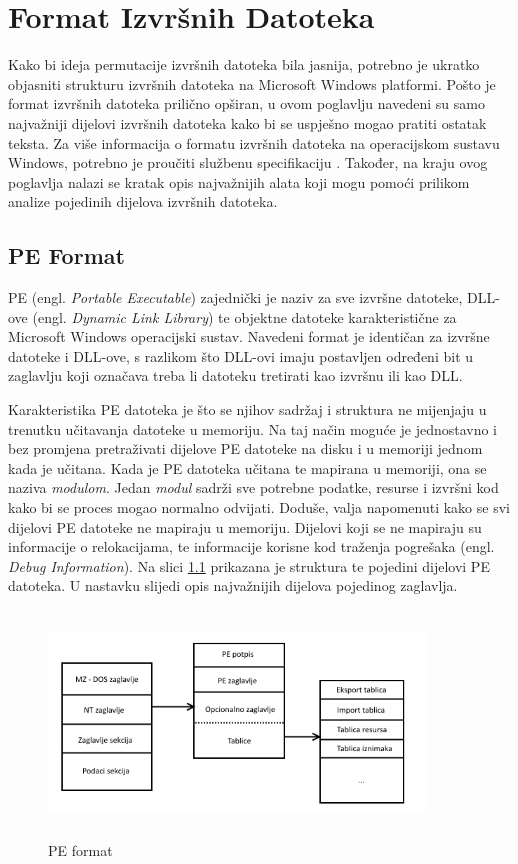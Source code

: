 \documentclass[times, utf8, diplomski, numeric]{fer}
\begin{document}
\chapter{Format Izvršnih Datoteka}
\label{sct:peFormat}

Kako bi ideja permutacije izvršnih datoteka bila jasnija,
potrebno je ukratko objasniti strukturu izvršnih datoteka na
Microsoft Windows platformi. Pošto je format izvršnih datoteka
prilično opširan, u ovom poglavlju navedeni su samo najvažniji
dijelovi izvršnih datoteka kako bi se uspješno mogao pratiti
ostatak teksta. Za više informacija o formatu izvršnih datoteka
na operacijskom sustavu Windows, potrebno je proučiti službenu
specifikaciju \citep{pe_spec}. Također, na kraju ovog poglavlja
nalazi se kratak opis najvažnijih alata koji mogu pomoći prilikom
analize pojedinih dijelova izvršnih datoteka.

\section{PE Format}

PE (engl. \emph{Portable Executable}) zajednički je naziv za sve			%
izvršne datoteke, DLL-ove (engl. \emph{Dynamic Link Library}) te
objektne datoteke karakteristične za Microsoft Windows
operacijski sustav. Navedeni format je identičan za izvršne
datoteke i DLL-ove, s razlikom što DLL-ovi imaju postavljen
određeni bit u zaglavlju koji označava treba li datoteku
tretirati kao izvršnu ili kao DLL.

Karakteristika PE datoteka je što se njihov sadržaj i struktura
ne mijenjaju u trenutku učitavanja datoteke u memoriju. Na taj
način moguće je jednostavno i bez promjena pretraživati dijelove
PE datoteke na disku i u memoriji jednom kada je učitana. Kada je
PE datoteka učitana te mapirana u memoriji, ona se naziva
\emph{modulom}. Jedan \emph{modul} sadrži sve potrebne podatke,
resurse i izvršni kod kako bi se proces mogao normalno odvijati.
Doduše, valja napomenuti kako se svi dijelovi PE datoteke ne
mapiraju u memoriju. Dijelovi koji se ne mapiraju su informacije
o relokacijama, te informacije korisne kod traženja pogrešaka
(engl. \emph{Debug Information}). Na slici \ref{fig:pe_format}
prikazana je struktura te pojedini dijelovi PE datoteka. U
nastavku slijedi opis najvažnijih dijelova pojedinog zaglavlja.

\begin{figure}
\centering
\setlength\fboxsep{0pt}
\setlength\fboxrule{0.5pt}
\includegraphics[width=10cm, height=6cm]{slike/pe_format}
\caption{PE format}
\label{fig:pe_format} 
\end{figure} 
\end{document}

